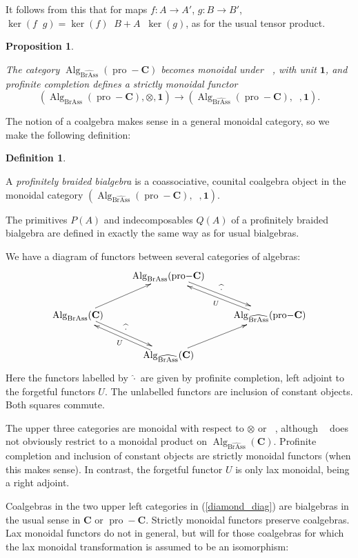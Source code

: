 \documentclass[12pt]{article}
\DeclareMathOperator{\Alg}{Alg}
\DeclareMathOperator{\pro}{pro}
\DeclareMathOperator{\BrAss}{BrAss}
\DeclareMathOperator{\hattimes}{\widehat{\otimes}}
\newcommand{\BrAsshat}{\widehat{\BrAss}} %
\newcommand{\bC} {\mathbf{C}}
\newcommand{\one} {\mathbf{1}}
\newcommand{\proC}{\pro\!-\bC}
\newcommand{\beqn}{\begin{equation}}
\newcommand{\eeqn}{\end{equation}}
\theoremstyle{plain}
\newtheorem{prop}[thm]{Proposition}
\theoremstyle{definition}
\newtheorem{defn}[thm]{Definition}
\theoremstyle{remark}
\begin{document}
It follows from this that for maps $f: A \to A'$, $g: B \to B'$, $\ker(f \hattimes g) = \ker(f) \hattimes B + A \hattimes \ker(g)$, as for the usual tensor product.

\begin{prop} \label{compare_tensors_prop} 

The category $\Alg_{\BrAsshat}(\proC)$ becomes monoidal under $\hattimes$, with unit $\one$, and profinite completion defines a strictly monoidal functor 
%
$$(\Alg_{\BrAss}(\proC), \otimes, \one) \to (\Alg_{\BrAsshat}(\proC), \hattimes, \one).$$

\end{prop}


The notion of a coalgebra makes sense in a general monoidal category, so we make the following definition:

\begin{defn} \label{pro_bialg_defn}

A \emph{profinitely braided bialgebra} is a coassociative, counital coalgebra object in the monoidal category $(\Alg_{\BrAsshat}(\proC), \hattimes, \one)$.

\end{defn}

The primitives $P(A)$ and indecomposables $Q(A)$ of a profinitely braided bialgebra are defined in exactly the same way as for usual bialgebras.

We have a diagram of functors between several categories of algebras:
%
\beqn \label{diamond_diag} \xymatrix{
 & \Alg_{\BrAss}(\proC) \ar@<0.5ex>[dr]^-{\widehat{\cdot}} & \\
\Alg_{\BrAss}(\bC) \ar[ur] \ar@<0.5ex>[dr]^-{\widehat{\cdot}} & & \Alg_{\BrAsshat}(\proC) \ar@<0.5ex>[ul]^-{U}\\
 & \Alg_{\BrAsshat}(\bC) \ar[ur]  \ar@<0.5ex>[ul]^-{U}& 
}\eeqn
Here the functors labelled by $\widehat{\cdot}$ are given by profinite completion, left adjoint to the forgetful functors $U$. The unlabelled functors are inclusion of constant objects.  Both squares commute.

The upper three categories are monoidal with respect to $\otimes$ or $\hattimes$, although $\hattimes$ does not obviously restrict to a monoidal product on $\Alg_{\BrAsshat}(\bC)$.  Profinite completion and inclusion of constant objects are strictly monoidal functors (when this makes sense).  In contrast, the forgetful functor $U$ is only lax monoidal, being a right adjoint.

Coalgebras in the two upper left categories in (\ref{diamond_diag}) are bialgebras in the usual sense in $\bC$ or $\proC$.  Strictly monoidal functors preserve coalgebras.  Lax monoidal functors do not in general, but will for those coalgebras for which the lax monoidal transformation is assumed to be an isomorphism:
\end{document}
